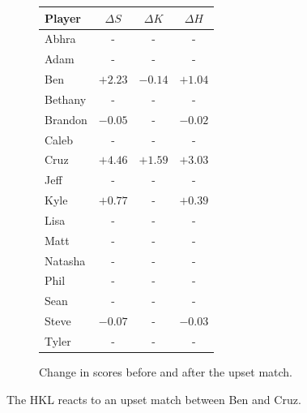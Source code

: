 \documentclass[letterpaper, 10 pt, conference]{ieeeconf}  %
\begin{document}
\begin{figure}[h!b]
        \begin{subfigure}[hb]{0.4\textwidth}
                \footnotesize
                \centering
                \begin{tabular}{lccc}
                        \toprule
                        Player	&	$\Delta S$	&	$\Delta K$	&	$\Delta H$	\\
                        \midrule							
                        Abhra	&	-	&	-	&	-	\\
                        Adam	&	-	&	-	&	-	\\
                        Ben	&	$+2.23$	&	$-0.14$	&	$+1.04$	\\
                        Bethany	&	-	&	-	&	-	\\
                        Brandon	&	$-0.05$	&	-	&	$-0.02$	\\
                        Caleb	&	-	&	-	&	-	\\
                        Cruz	&	$+4.46$	&	$+1.59$	&	$+3.03$	\\
                        Jeff	&	-	&	-	&	-	\\
                        Kyle	&	$+0.77$	&	-	&	$+0.39$	\\
                        Lisa	&	-	&	-	&	-	\\
                        Matt	&	-	&	-	&	-	\\
                        Natasha	&	-	&	-	&	-	\\
                        Phil	&	-	&	-	&	-	\\
                        Sean	&	-	&	-	&	-	\\
                        Steve	&	$-0.07$	&	-	&	$-0.03$	\\
                        Tyler	&	-	&	-	&	- \\
                        \bottomrule
                \end{tabular}
                \caption{Change in scores before and after the upset match.}
        \end{subfigure}

        \caption{The HKL reacts to an upset match between Ben and Cruz.}
\end{figure}
\end{document}
